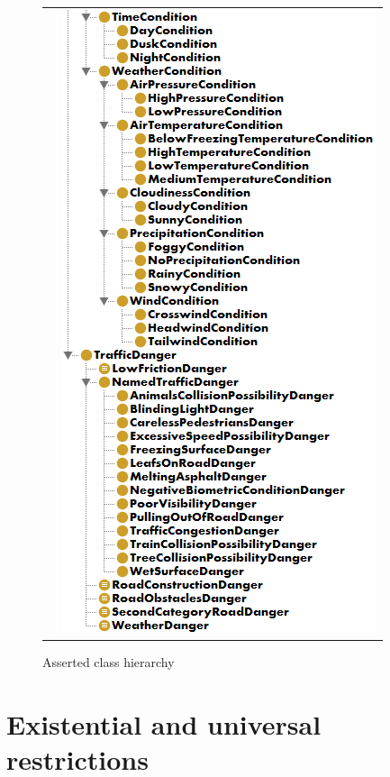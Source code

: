 \begin{figure}[htp]
\begin{tabular}[t]{ll}
& \includegraphics[scale=0.7]{images/chapter3/OntologyPart2}
\end{tabular}
\caption{Asserted class hierarchy}
\label{fig:assertedClassHierarchy}
\end{figure}

\newpage

\section{Existential and universal restrictions}
\label{sec:existentialAndUniversalRestrictions}

